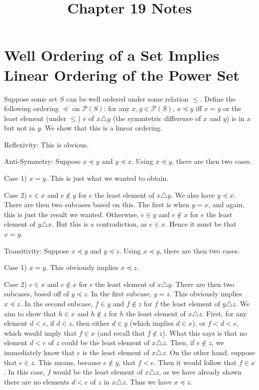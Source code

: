 \documentclass{article}
\title{Chapter 19 Notes}
\theoremstyle{definition}
\begin{document}
\date{}
\maketitle

\section*{Well Ordering of a Set Implies Linear Ordering of the Power Set}
Suppose some set $S$ can be well ordered under some relation $\le$. Define the following ordering $\preceq$ on 
$\mathcal{P}(S)$: for any $x,y\in\mathcal{P}(S)$, $x\preceq y$ iff 
$x=y$ or the least element (under $\le$) $e$ of $x\triangle y$ (the symmtetric difference of $x$ and $y$) 
is in $x$ but not in $y$. We show that this is a linear ordering.

Reflexivity: This is obvious.

Anti-Symmetry: Suppose $x\preceq y$ and $y\preceq x$. Using $x\preceq y$, there are then two cases.

Case 1) $x=y$. This is just what we wanted to obtain.

Case 2) $e\in x$ and $e\notin y$ for $e$ the least element of $x\triangle y$. We also have $y\preceq x$. There are then two 
subcases based on this. The first is when $y=x$, and again, this is just the result we wanted. Otherwise, 
$e\in y$ and $e\notin x$ for $e$ the least element of $y\triangle x$. But this is a contradiction, as 
$e\in x$. Hence it must be that $x=y$.

Transitivity: Suppose $x\preceq y$ and $y\preceq z$. Using $x\preceq y$, there are then two cases.

Case 1) $x=y$. This obviously implies $x\preceq z$.

Case 2) $e\in x$ and $e\notin x$ for $e$ the least element of $x\triangle y$. There are then two subcases, based off of 
$y\preceq z$. In the first subcase, 
$y=z$. This obviously implies $x\preceq z$. In the second subcase, $f\in y$ and $f\notin z$ for $f$ the least element of 
$y\triangle z$. We aim to show that $h\in x$ and $h\notin z$ for $h$ the least element of $x\triangle z$. First, for any element 
$d<e$, if $d\in z$, then either $d\in y$ (which implies $d\in x$), or $f<d<e$, which would imply that $f\in x$ (and 
recall that $f\notin z$). What this says is that no 
element $d<e$ of $z$ could be the least element of $x\triangle z$. Then, if 
$e\notin z$, we immediately know that $e$ is the least element of $x\triangle z$. On the other hand, suppose that $e\in z$. 
This means, because $e\notin y$, that $f<e$. Then it would follow that $f\in x$. In this case, $f$ would be the least element of 
$x\triangle z$, as we have already shown there are no elements $d<e$ of $z$ in $x\triangle z$. Thus we have $x\preceq z$. 
\end{document}
